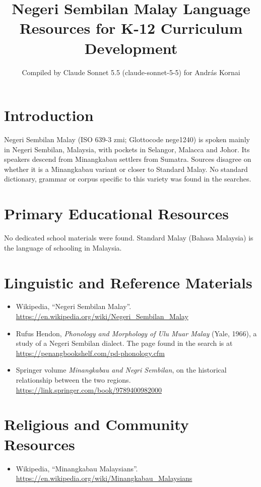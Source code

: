 \documentclass[12pt]{article}
\title{Negeri Sembilan Malay Language Resources for K-12 Curriculum Development}
\author{Compiled by Claude Sonnet 5.5 (claude-sonnet-5-5) for Andr\'as Kornai}
\date{}
\begin{document}
\maketitle

\section{Introduction}
Negeri Sembilan Malay (ISO 639-3 zmi; Glottocode nege1240) is spoken mainly in Negeri Sembilan, Malaysia, with pockets in Selangor, Malacca and Johor. Its speakers descend from Minangkabau settlers from Sumatra. Sources disagree on whether it is a Minangkabau variant or closer to Standard Malay. No standard dictionary, grammar or corpus specific to this variety was found in the searches.

\section{Primary Educational Resources}
No dedicated school materials were found. Standard Malay (Bahasa Malaysia) is the language of schooling in Malaysia.

\section{Linguistic and Reference Materials}
\begin{itemize}
\item Wikipedia, ``Negeri Sembilan Malay''. \url{https://en.wikipedia.org/wiki/Negeri_Sembilan_Malay}
\item Rufus Hendon, \emph{Phonology and Morphology of Ulu Muar Malay} (Yale, 1966), a study of a Negeri Sembilan dialect. The page found in the search is at \url{https://penangbookshelf.com/pd-phonology.cfm}
\item Springer volume \emph{Minangkabau and Negri Sembilan}, on the historical relationship between the two regions. \url{https://link.springer.com/book/9789400982000}
\end{itemize}

\section{Religious and Community Resources}
\begin{itemize}
\item Wikipedia, ``Minangkabau Malaysians''. \url{https://en.wikipedia.org/wiki/Minangkabau_Malaysians}
\end{itemize}
\end{document}
